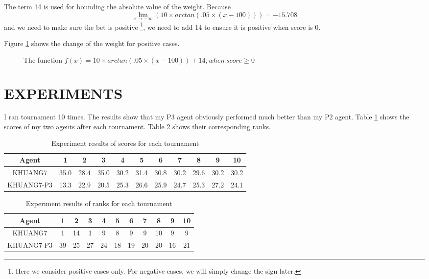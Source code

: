 \documentclass[10pt]{article}
\begin{document}
The term 14 is used for bounding the absolute value of the weight. Because 
$$
\lim_{x \to -\infty} (10\times arctan(.05\times (x - 100))) = -15.708
$$ and we need to make sure the bet is positive \footnote{Here we consider positive cases only. For negative cases, we will simply change the sign later.}, we need to add 14 to ensure it is positive when score is 0.

Figure \ref{figure:a} shows the change of the weight for positive cases.

\begin{figure}
\centering
{}
\caption{The function $f(x)=10\times arctan(.05\times (x - 100)) + 14, when\ score\geq 0$}
\label{figure:a}
\end{figure}

\section{EXPERIMENTS}
I ran tournament 10 times. The results show that my P3 agent obviously performed much better than my P2 agent. Table \ref{tab:res1} shows the scores of my two agents after each tournament. Table \ref{tab:res2} shows their corresponding ranks.

\begin{table}
\caption{Experiment results of scores for each tournament}
\label{tab:res1}
\center
\begin{tabular}{ c c c c c c c c c c c } \hline
Agent		&1		&2		&3		&4		&5		&6		&7		&8		&9		&10\\ \hline
KHUANG7		&35.0	&28.4	&35.0	&30.2	&31.4	&30.8	&30.2	&29.6	&30.2	&30.2 \\
KHUANG7-P3	&13.3	&22.9	&20.5	&25.3	&26.6	&25.9	&24.7	&25.3	&27.2	&24.1 \\ \hline
\end{tabular}
\end{table}

\begin{table}
\caption{Experiment results of ranks for each tournament}
\label{tab:res2}
\center
\begin{tabular}{ c c c c c c c c c c c } \hline
Agent		&1		&2		&3		&4		&5		&6		&7		&8		&9		&10\\ \hline
KHUANG7		&1		&14		&1		&9		&8		&9		&9		&10		&9		&9\\
KHUANG7-P3	&39		&25		&27		&24		&18		&19		&20		&20		&16		&21\\ \hline
\end{tabular}
\end{table}
\end{document}
